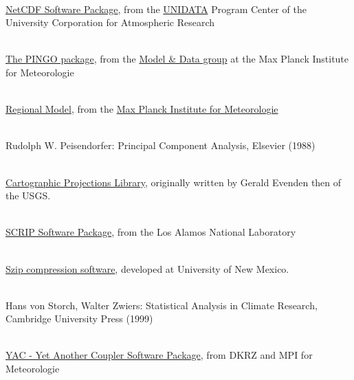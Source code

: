 \begin{thebibliography}{xx}
 \ \\
  \href{https://www.unidata.ucar.edu/software/netcdf}{NetCDF Software Package},
  from the
  \href{https://www.unidata.ucar.edu}{UNIDATA}
  Program Center of the University Corporation for Atmospheric Research


 \ \\
  \href{http://www.mad.zmaw.de/Pingo/post/down/BigPingo.pdf}{The PINGO package},
  from the
  \href{http://www.mad.zmaw.de}{Model \& Data group}
  at the Max Planck Institute for Meteorologie


 \ \\
  \href{http://www.remo-rcm.de/}{Regional Model},
  from the
  \href{http://www.mpimet.mpg.de}
       {Max Planck Institute for Meteorologie}


 \ \\
  Rudolph W. Peisendorfer: Principal Component Analysis, Elsevier (1988)


 \ \\
  \href{https://github.com/OSGeo/proj.4/wiki}{Cartographic Projections Library},
  originally written by Gerald Evenden then of the USGS.


 \ \\
  \href{http://oceans11.lanl.gov/trac/SCRIP}{SCRIP Software Package},
  from the Los Alamos National Laboratory


 \ \\
  \href{http://www.hdfgroup.org/doc_resource/SZIP}{Szip compression software},
  developed at University of New Mexico.


 \ \\
  Hans von Storch, Walter Zwiers: Statistical Analysis in Climate Research, Cambridge University Press (1999)


 \ \\
  \href{https://doc.redmine.dkrz.de/YAC/html}{YAC - Yet Another Coupler Software Package},
  from DKRZ and MPI for Meteorologie

\end{thebibliography}
